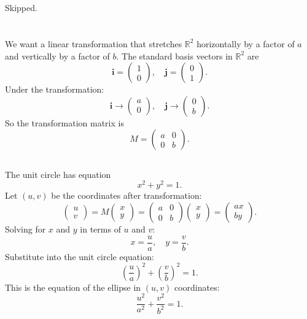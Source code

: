 \documentclass{article}
\begin{document}
\section{}
Skipped. 
\section{}
\subsection{}
We want a linear transformation that stretches $\mathbb{R}^2$ horizontally by a factor of $a$ and vertically by a factor of $b$. The standard basis vectors in $\mathbb{R}^2$ are \[ \mathbf{i} = \begin{pmatrix}1\\0\end{pmatrix}, \quad \mathbf{j} = \begin{pmatrix}0\\1\end{pmatrix}. \] Under the transformation: \[ \mathbf{i} \xrightarrow{} \begin{pmatrix}a\\0\end{pmatrix}, \quad \mathbf{j} \xrightarrow{} \begin{pmatrix}0\\b\end{pmatrix}. \] So the transformation matrix is \[ M = \begin{pmatrix} a & 0 \\ 0 & b \end{pmatrix}. \]
\subsection{}
The unit circle has equation \[ x^2 + y^2 = 1. \] Let $(u,v)$ be the coordinates after transformation: \[ \begin{pmatrix} u \\ v \end{pmatrix} = M \begin{pmatrix} x \\ y \end{pmatrix} = \begin{pmatrix} a & 0 \\ 0 & b \end{pmatrix} \begin{pmatrix} x \\ y \end{pmatrix} = \begin{pmatrix} ax \\ by \end{pmatrix}. \] Solving for $x$ and $y$ in terms of $u$ and $v$: \[ x = \frac{u}{a}, \quad y = \frac{v}{b}. \] Substitute into the unit circle equation: \[ \left(\frac{u}{a}\right)^2 + \left(\frac{v}{b}\right)^2 = 1. \] This is the equation of the ellipse in $(u,v)$ coordinates: \[ \frac{u^2}{a^2} + \frac{v^2}{b^2} = 1. \]
\end{document}
